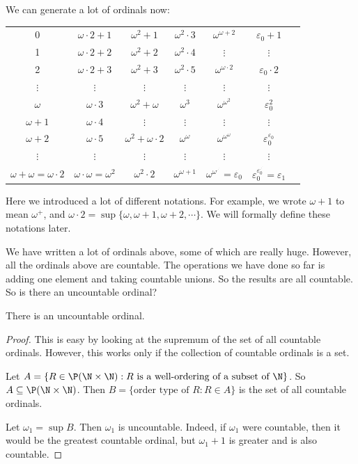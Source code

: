 \documentclass[a4paper]{article}
\begin{document}
We can generate a lot of ordinals now:
\begin{center}
  \begin{tabular}{ccccccc}
    0 & $\omega\cdot 2 + 1$ & $\omega^2 + 1$ & $\omega^2\cdot 3$ & $\omega^{\omega + 2}$ & $\varepsilon_0 + 1$ \\
    1 & $\omega\cdot 2 + 2$ & $\omega^2 + 2$ & $\omega^2\cdot 4$ & $\vdots$ & $\vdots$ \\
    2 & $\omega\cdot 2 + 3$ & $\omega^2 + 3$ & $\omega^2\cdot 5$ & $\omega^{\omega \cdot 2}$ & $\varepsilon_0 \cdot 2$ \\
    $\vdots$ & $\vdots$ & $\vdots$ & $\vdots$ & $\vdots$ & $\vdots$ \\
    $\omega$ & $\omega\cdot 3$ & $\omega^2 + \omega$ & $\omega^3$ & $\omega^{\omega^2}$ & $\varepsilon_0^2$ \\
    $\omega + 1$ & $\omega\cdot 4$ & $\vdots$ & $\vdots$ & $\vdots$ & $\vdots$ \\
    $\omega + 2$ & $\omega\cdot 5$ & $\omega^2 + \omega \cdot 2$ & $\omega^\omega$ & $\omega^{\omega^{\omega}}$ & $\varepsilon_0^{\varepsilon_0}$ \\
    $\vdots$ & $\vdots$ & $\vdots$ & $\vdots$ & $\vdots$ & $\vdots$ \\
    $\omega + \omega = \omega\cdot 2$ & $\omega\cdot \omega = \omega^2$ & $\omega^2 \cdot 2$ & $\omega^{\omega + 1}$ & $\omega^{\omega^{.^{.^.}}} = \varepsilon_0$ & $\varepsilon_0^{\varepsilon_0^{.^{.^.}}} = \varepsilon_1$ \\
  \end{tabular}
\end{center}
Here we introduced a lot of different notations. For example, we wrote $\omega + 1$ to mean $\omega^+$, and $\omega\cdot 2 = \sup\{\omega, \omega + 1, \omega + 2, \cdots\}$. We will formally define these notations later.

We have written a lot of ordinals above, some of which are really huge. However, all the ordinals above are countable. The operations we have done so far is adding one element and taking countable unions. So the results are all countable. So is there an uncountable ordinal?

\begin{thm}
  There is an uncountable ordinal.
\end{thm}

\begin{proof}
  This is easy by looking at the supremum of the set of all countable ordinals. However, this works only if the collection of countable ordinals is a set.

  Let $A = \{R\in \P(\N\times \N): R \text{ is a well-ordering of a subset of }\N\}$. So $A \subseteq \P(\N\times \N)$. Then $B = \{\text{order type of }R: R\in A\}$ is the set of all countable ordinals.

  Let $\omega_1 = \sup B$. Then $\omega_1$ is uncountable. Indeed, if $\omega_1$ were countable, then it would be the greatest countable ordinal, but $\omega_1 + 1$ is greater and is also countable.
\end{proof}
\end{document}
